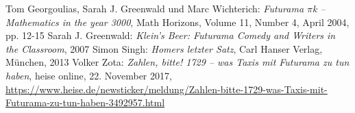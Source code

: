 {{\begin{thebibliography}{99999}
   Tom Georgoulias, Sarah J. Greenwald und Marc Wichterich: \textit{Futurama $\pi$k -- Mathematics in the year 3000}, Math Horizons, Volume 11, Number 4, April 2004, pp. 12-15
   Sarah J. Greenwald: \textit{Klein's Beer: Futurama Comedy and Writers in the Classroom}, 2007
   Simon Singh: \textit{Homers letzter Satz}, Carl Hanser Verlag, München, 2013
   Volker Zota: \textit{Zahlen, bitte! 1729 -- was Taxis mit Futurama zu tun haben}, heise online, 22. November 2017, \href{https://www.heise.de/newsticker/meldung/Zahlen-bitte-1729-was-Taxis-mit-Futurama-zu-tun-haben-3492957.html}{\url{https://www.heise.de/newsticker/meldung/Zahlen-bitte-1729-was-Taxis-mit-Futurama-zu-tun-haben-3492957.html}}
\end{thebibliography}
}
}
